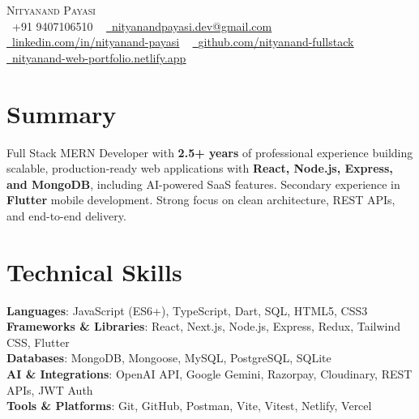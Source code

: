 \documentclass[letterpaper,11pt]{article}
\begin{document}
\begin{center}
    {\Huge \scshape Nityanand Payasi} \\ \vspace{3pt}
    \small
    \raisebox{-0.1\height}\faPhone\ +91 9407106510 ~
    \href{mailto:nityanandpayasi.dev@gmail.com}{\raisebox{-0.2\height}\faEnvelope\  \underline{nityanandpayasi.dev@gmail.com}} \\ \vspace{3pt}
    \href{https://www.linkedin.com/in/nityanand-payasi-7281543a3}{\raisebox{-0.2\height}\faLinkedin\ \underline{linkedin.com/in/nityanand-payasi}} ~
    \href{https://github.com/nityanand-fullstack}{\raisebox{-0.2\height}\faGithub\ \underline{github.com/nityanand-fullstack}} ~
    \href{https://nityanand-web-portfolio.netlify.app/}{\raisebox{-0.2\height}\faGlobe\ \underline{nityanand-web-portfolio.netlify.app}}
    \vspace{-8pt}
\end{center}

\section{Summary}
\vspace{2pt}
\small{Full Stack MERN Developer with \textbf{2.5+ years} of professional experience building scalable,
production-ready web applications with \textbf{React, Node.js, Express, and MongoDB}, including AI-powered SaaS
features. Secondary experience in \textbf{Flutter} mobile development. Strong focus on clean architecture,
REST APIs, and end-to-end delivery.}
\vspace{-6pt}

\section{Technical Skills}
\begin{itemize}[leftmargin=0.15in, label={}]
    \small{\item{
      \textbf{Languages}{: JavaScript (ES6+), TypeScript, Dart, SQL, HTML5, CSS3} \\
      \textbf{Frameworks \& Libraries}{: React, Next.js, Node.js, Express, Redux, Tailwind CSS, Flutter} \\
      \textbf{Databases}{: MongoDB, Mongoose, MySQL, PostgreSQL, SQLite} \\
      \textbf{AI \& Integrations}{: OpenAI API, Google Gemini, Razorpay, Cloudinary, REST APIs, JWT Auth} \\
      \textbf{Tools \& Platforms}{: Git, GitHub, Postman, Vite, Vitest, Netlify, Vercel}
    }}
\end{itemize}
\vspace{-14pt}
\end{document}
